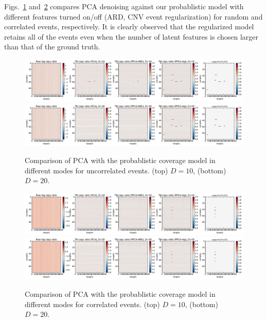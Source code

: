 \documentclass[nofootinbib,amssymb,amsmath]{revtex4}
\begin{document}
Figs.~\ref{fig:comp_random} and~\ref{fig:comp_correlated} compares PCA denoising against our probablistic model with different features turned on/off (ARD, CNV event regularization) for random and correlated events, respectively. It is clearly observed that the regularized model retains all of the events even when the number of latent features is chosen larger than that of the ground truth.

\begin{figure}
\center
\includegraphics[scale=0.4]{figs/comp_random_events_10.pdf}
\includegraphics[scale=0.4]{figs/comp_random_events_20.pdf}
\caption{Comparison of PCA with the probablistic coverage model in different modes for uncorrelated events. (top) $D=10$, (bottom) $D=20$.}
\label{fig:comp_random}
\end{figure}

\begin{figure}
\center
\includegraphics[scale=0.4]{figs/comp_corr_events_10.pdf}
\includegraphics[scale=0.4]{figs/comp_corr_events_20.pdf}
\caption{Comparison of PCA with the probablistic coverage model in different modes for correlated events. (top) $D=10$, (bottom) $D=20$.}
\label{fig:comp_correlated}
\end{figure}


\appendix
\end{document}
